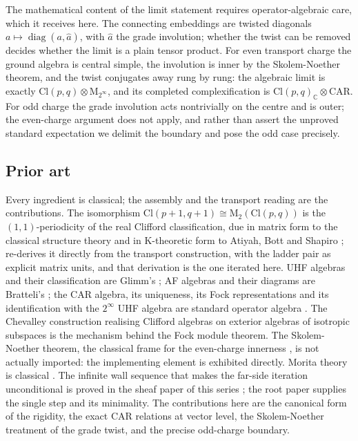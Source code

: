 \documentclass[11pt]{article}
\theoremstyle{definition}
\theoremstyle{plain}
\providecommand{\C}{}\renewcommand{\C}{\mathbb{C}}
\providecommand{\CAR}{}\renewcommand{\CAR}{\mathrm{CAR}}
\providecommand{\Cl}{}\renewcommand{\Cl}{\mathrm{Cl}}
\providecommand{\Mat}{}\renewcommand{\Mat}{\mathrm{M}}
\begin{document}
The mathematical content of the limit statement requires operator-algebraic care, which it receives here. The connecting embeddings are twisted diagonals $a \mapsto \operatorname{diag}(a, \hat a)$, with $\hat a$ the grade involution; whether the twist can be removed decides whether the limit is a plain tensor product. For even transport charge the ground algebra is central simple, the involution is inner by the Skolem-Noether theorem, and the twist conjugates away rung by rung: the algebraic limit is exactly $\Cl(p,q) \otimes \Mat_{2^\infty}$, and its completed complexification is $\Cl(p,q)_\C \otimes \CAR$. For odd charge the grade involution acts nontrivially on the centre and is outer; the even-charge argument does not apply, and rather than assert the unproved standard expectation we delimit the boundary and pose the odd case precisely.

\subsection*{Prior art}
\label{c:note.tower.setting-prior-art}
Every ingredient is classical; the assembly and the transport reading are the contributions. The isomorphism $\Cl(p{+}1,q{+}1) \cong \Mat_2(\Cl(p,q))$ is the $(1,1)$-periodicity of the real Clifford classification, due in matrix form to the classical structure theory \cite{Porteous1995, Lounesto2001} and in K-theoretic form to Atiyah, Bott and Shapiro \cite{ABS1964}; \cite{ButlerT1} re-derives it directly from the transport construction, with the ladder pair as explicit matrix units, and that derivation is the one iterated here. UHF algebras and their classification are Glimm's \cite{Glimm1960}; AF algebras and their diagrams are Bratteli's \cite{Bratteli1972}; the CAR algebra, its uniqueness, its Fock representations and its identification with the $2^\infty$ UHF algebra are standard operator algebra \cite{BratteliRobinson1997}. The Chevalley construction realising Clifford algebras on exterior algebras of isotropic subspaces \cite{Chevalley1997} is the mechanism behind the Fock module theorem. The Skolem-Noether theorem, the classical frame for the even-charge innerness \cite{Pierce1982}, is not actually imported: the implementing element is exhibited directly. Morita theory is classical \cite{Lam1999}. The infinite wall sequence that makes the far-side iteration unconditional is proved in the sheaf paper of this series \cite{ButlerT4}; the root paper \cite{ButlerT1} supplies the single step and its minimality. The contributions here are the canonical form of the rigidity, the exact CAR relations at vector level, the Skolem-Noether treatment of the grade twist, and the precise odd-charge boundary.
\end{document}
